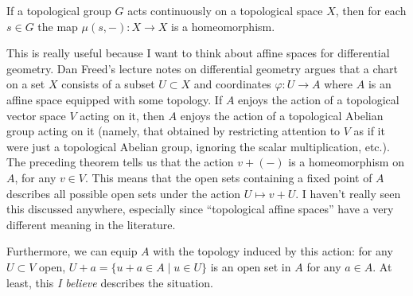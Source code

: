 \begin{theorem}
If a topological group $G$ acts continuously on a topological space
$X$, then for each $s\in G$ the map $\mu(s,-)\colon X\to X$ is a homeomorphism.
\end{theorem}


\begin{remark}
This is really useful because I want to think about affine spaces for
differential geometry. Dan Freed's lecture notes on differential
geometry argues that a chart on a set $X$ consists of a subset
$U\subset X$ and coordinates $\varphi\colon U\to A$ where $A$ is an
affine space equipped with some topology. If $A$ enjoys the action of
a topological vector space $V$ acting on it, then $A$ enjoys the
action of a topological Abelian group acting on it (namely, that
obtained by restricting attention to $V$ as if it were just a
topological Abelian group, ignoring the scalar multiplication,
etc.). The preceding theorem tells us that the action $v+(-)$ is a
homeomorphism on $A$, for any $v\in V$. This means that the open sets
containing a fixed point of $A$ describes all possible open sets under
the action $U\mapsto v+U$. I haven't really seen this discussed
anywhere, especially since ``topological affine spaces'' have a very
different meaning in the literature.

Furthermore, we can equip $A$ with the topology induced by this
action: for any $U\subset V$ open, $U+a=\{u+a\in A\mid u\in U\}$ is an
open set in $A$ for any $a\in A$. At least, this \emph{I believe}
describes the situation.
\end{remark}